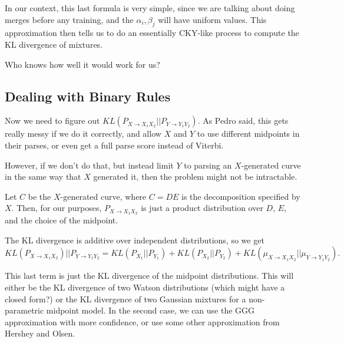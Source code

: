 \documentclass{article}
\begin{document}
In our context, this last formula is very simple, since we are talking
about doing merges before any training, and the $\alpha_i, \beta_j$
will have uniform values. This approximation then tells us to do an
essentially CKY-like process to compute the KL divergence of mixtures.

Who knows how well it would work for us?

\subsection{Dealing with Binary Rules}

Now we need to figure out $KL( P_{X\to X_1 X_2} || P_{Y \to Y_1
  Y_2})$. As Pedro said, this gets really messy if we do it correctly,
and allow $X$ and $Y$ to use different midpoints in their parses, or
even get a full parse score instead of Viterbi.

However, if we don't do that, but instead limit $Y$ to parsing an
$X$-generated curve in the same way that $X$ generated it, then the
problem might not be intractable.

Let $C$ be the $X$-generated curve, where $C=DE$ is the decomposition
specified by $X$. Then, for our purposes, $P_{X\to X_1 X_2}$ is just a
product distribution over $D$, $E$, and the choice of the midpoint.

The KL divergence is additive over independent distributions, so we get
$$KL(P_{X\to X_1 X_2}) || P_{Y\to Y_1 Y_2} = KL(P_{X_1} || P_{Y_1}) +
KL(P_{X_2} || P_{Y_2}) + KL(\mu_{X\to X_1 X_2} || \mu_{Y\to Y_1
  Y_2}).$$

This last term is just the KL divergence of the midpoint
distributions. This will either be the KL divergence of two Watson
distributions (which might have a closed form?) or the KL divergence
of two Gaussian mixtures for a non-parametric midpoint model. In the
second case, we can use the GGG approximation with more confidence, or
use some other approximation from Hershey and Olsen.
\end{document}
